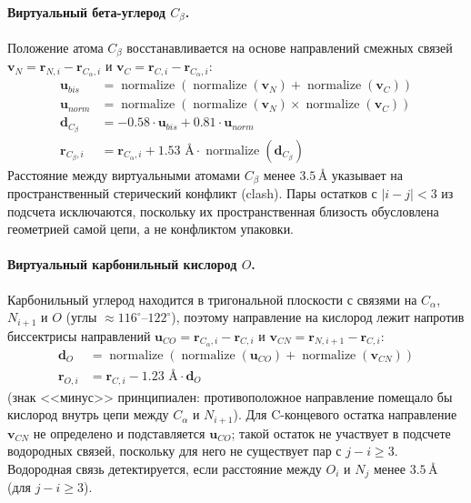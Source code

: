 \documentclass[12pt, a4paper]{article}
\begin{document}
\paragraph{Виртуальный бета-углерод $C_\beta$.}
Положение атома $C_\beta$ восстанавливается на основе направлений смежных связей $\mathbf{v}_{N} = \mathbf{r}_{N, i} - \mathbf{r}_{C_\alpha, i}$ и $\mathbf{v}_{C} = \mathbf{r}_{C, i} - \mathbf{r}_{C_\alpha, i}$:
\begin{align}
    \mathbf{u}_{bis} &= \operatorname{normalize}\left(\operatorname{normalize}(\mathbf{v}_N) + \operatorname{normalize}(\mathbf{v}_C)\right) \\
    \mathbf{u}_{norm} &= \operatorname{normalize}\left(\operatorname{normalize}(\mathbf{v}_N) \times \operatorname{normalize}(\mathbf{v}_C)\right) \\
    \mathbf{d}_{C_\beta} &= -0.58 \cdot \mathbf{u}_{bis} + 0.81 \cdot \mathbf{u}_{norm} \\
    \mathbf{r}_{C_\beta, i} &= \mathbf{r}_{C_\alpha, i} + 1.53 \text{ \AA} \cdot \operatorname{normalize}(\mathbf{d}_{C_\beta})
\end{align}
Расстояние между виртуальными атомами $C_\beta$ менее $3.5\,\text{\AA}$ указывает на пространственный стерический конфликт (clash). Пары остатков с $|i-j| < 3$ из подсчета исключаются, поскольку их пространственная близость обусловлена геометрией самой цепи, а не конфликтом упаковки.

\paragraph{Виртуальный карбонильный кислород $O$.}
Карбонильный углерод находится в тригональной плоскости с связями на $C_\alpha$, $N_{i+1}$ и $O$ (углы $\approx 116^\circ$--$122^\circ$), поэтому направление на кислород лежит напротив биссектрисы направлений $\mathbf{u}_{CO} = \mathbf{r}_{C_\alpha, i} - \mathbf{r}_{C, i}$ и $\mathbf{v}_{CN} = \mathbf{r}_{N, i+1} - \mathbf{r}_{C, i}$:
\begin{align}
    \mathbf{d}_{O} &= \operatorname{normalize}\left(\operatorname{normalize}(\mathbf{u}_{CO}) + \operatorname{normalize}(\mathbf{v}_{CN})\right) \\
    \mathbf{r}_{O, i} &= \mathbf{r}_{C, i} - 1.23 \text{ \AA} \cdot \mathbf{d}_{O}
\end{align}
(знак <<минус>> принципиален: противоположное направление помещало бы кислород внутрь цепи между $C_\alpha$ и $N_{i+1}$). Для C-концевого остатка направление $\mathbf{v}_{CN}$ не определено и подставляется $\mathbf{u}_{CO}$; такой остаток не участвует в подсчете водородных связей, поскольку для него не существует пар с $j - i \ge 3$.
Водородная связь детектируется, если расстояние между $O_i$ и $N_j$ менее $3.5\,\text{\AA}$ (для $j-i \ge 3$).
\end{document}
